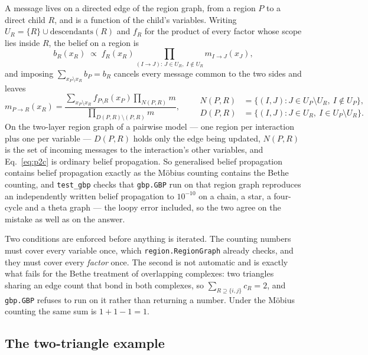 \documentclass[aps,pre,onecolumn,superscriptaddress,floatfix,nofootinbib]{revtex4-2}
\newcommand{\code}[1]{\texttt{#1}}
\begin{document}
A message lives on a directed edge of the region graph, from a region $P$ to a
direct child $R$, and is a function of the child's variables. Writing
$U_R=\{R\}\cup\mathrm{descendants}(R)$ and $f_R$ for the product of every factor
whose scope lies inside $R$, the belief on a region is
\begin{equation}
  b_R(x_R)\;\propto\;f_R(x_R)\!\!\prod_{(I\to J):\,J\in U_R,\;I\notin U_R}\!\!
  m_{I\to J}(x_J),
\end{equation}
and imposing $\sum_{x_P\setminus x_R}b_P=b_R$ cancels every message common to
the two sides and leaves
\begin{equation}
  m_{P\to R}(x_R)=\frac{\displaystyle\sum_{x_P\setminus x_R}f_{P\setminus R}(x_P)
    \prod_{N(P,R)}m}{\displaystyle\prod_{D(P,R)\setminus(P,R)}m},
  \qquad
  \begin{aligned}
    N(P,R)&=\{(I,J):J\in U_P\setminus U_R,\ I\notin U_P\},\\
    D(P,R)&=\{(I,J):J\in U_R,\ I\in U_P\setminus U_R\}.
  \end{aligned}
  \label{eq:p2c}
\end{equation}
On the two-layer region graph of a pairwise model --- one region per interaction
plus one per variable --- $D(P,R)$ holds only the edge being updated, $N(P,R)$
is the set of incoming messages to the interaction's other variables, and
Eq.~\eqref{eq:p2c} is ordinary belief propagation. So generalised belief
propagation contains belief propagation exactly as the M\"obius counting
contains the Bethe counting, and \code{test\_gbp} checks that
\code{gbp.GBP} run on that region graph reproduces an independently written
belief propagation to $10^{-10}$ on a chain, a star, a four-cycle and a theta
graph --- the loopy error included, so the two agree on the mistake as well as
on the answer.

Two conditions are enforced before anything is iterated. The counting numbers
must cover every variable once, which \code{region.RegionGraph} already checks,
and they must cover every \emph{factor} once. The second is not automatic and is
exactly what fails for the Bethe treatment of overlapping complexes: two
triangles sharing an edge count that bond in both complexes, so
$\sum_{R\supseteq\{i,j\}}c_R=2$, and \code{gbp.GBP} refuses to run on it rather
than returning a number. Under the M\"obius counting the same sum is
$1+1-1=1$.

\subsection{The two-triangle example}
\end{document}
